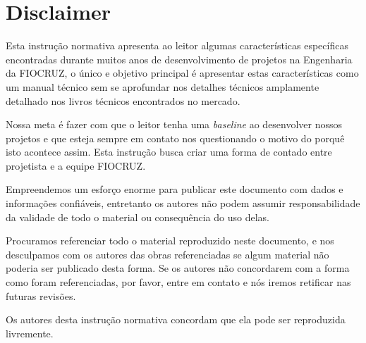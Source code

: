 \section*{Disclaimer} \label{section: disclaimer}

Esta instrução normativa apresenta ao leitor algumas características específicas encontradas durante muitos anos de desenvolvimento de projetos na Engenharia da FIOCRUZ, o único e objetivo principal é apresentar estas características como um manual técnico sem se aprofundar nos detalhes técnicos amplamente detalhado nos livros técnicos encontrados no mercado.

Nossa meta é fazer com que o leitor tenha uma \textit{baseline} ao desenvolver nossos projetos e que esteja sempre em contato nos questionando o motivo do porquê isto acontece assim. Esta instrução busca criar uma forma de contado entre projetista e a equipe FIOCRUZ.

Empreendemos um esforço enorme para publicar este documento com dados e informações confiáveis, entretanto os autores não podem assumir responsabilidade da validade de todo o material ou consequência do uso delas.

Procuramos referenciar todo o material reproduzido neste documento, e nos desculpamos com os autores das obras referenciadas se algum material não poderia ser publicado desta forma. Se os autores não concordarem com a forma como foram referenciadas, por favor, entre em contato e nós iremos retificar nas futuras revisões.

Os autores desta instrução normativa concordam que ela pode ser reproduzida livremente.